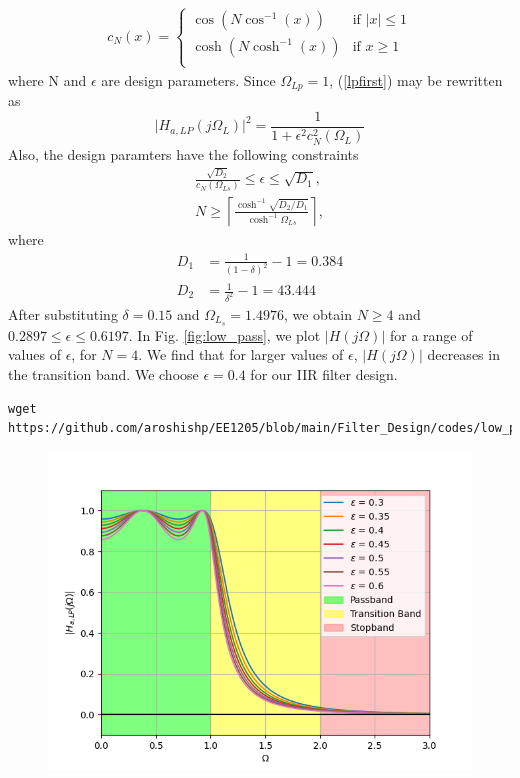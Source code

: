 \documentclass{article}
\begin{document}
\begin{enumerate}
\begin{align*}
    c_N(x) = \begin{cases}
        \cos(N\cos^{-1}(x)) & \text{if } \lvert x \rvert \leq 1\\
        \operatorname{cosh}(N\cosh^{-1}(x)) & \text{if } x \geq 1\\
    \end{cases}
\end{align*}
where N and $\epsilon$ are design parameters.  Since $\Omega_{Lp} = 1$, (\ref{lpfirst}) may be rewritten as
\begin{equation}
\label{lpsecond}
\vert H_{a,LP}(j\Omega_L)\vert^2 = \frac{1}{1 + \epsilon^2c_N^2(\Omega_L)}
\end{equation}
Also, the design paramters have the following constraints
\begin{eqnarray}
\label{lpdesign}
\frac{\sqrt{D_2}}{c_N(\Omega_{Ls})} \leq \epsilon \leq \sqrt{D_1}, \nonumber \\
N \geq \left\lceil \frac{\cosh^{-1}\sqrt{D_2/D_1}}{\cosh^{-1}\Omega_{Ls}} \right\rceil,
\end{eqnarray}
where 
\begin{align*}
    D_1 &= \frac{1}{(1 - \delta)^2}-1 = 0.384\\
    D_2 &= \frac{1}{\delta^2} - 1 = 43.444
\end{align*}
After substituting $\delta = 0.15$ and $\Omega_{L_s} = 1.4976$, 
we obtain $N \geq 4$ and $0.2897 \leq \epsilon \leq 0.6197$.  In Fig. \ref{fig:low_pass}, we plot $\vert H(j\Omega)\vert$ for a range of values of $\epsilon$, for $N = 4$.  We find that for larger values of $\epsilon$, $|H(j\Omega)|$ decreases in the transition band.  We choose $\epsilon = 0.4$  for our IIR filter design.
\begin{lstlisting}[caption = {Code for Figure 1}]
wget https://github.com/aroshishp/EE1205/blob/main/Filter_Design/codes/low_pass.py
\end{lstlisting}
\begin{figure}[!h]
    \centering
    \includegraphics[width = \columnwidth]{figs/low_pass.png}

\end{figure}
\end{enumerate}
\end{document}
